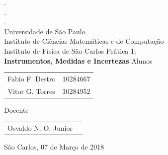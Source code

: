 \documentclass{article}
\begin{document}
\begin{titlepage}
	\centering
	{\Large
	{\color{white}.\\.\\.} \\
	Universidade de São Paulo\\
	Instituto de Ciências Matemáticas e de Computação\\\vspace{1.8mm}
	Instituto de Física de São Carlos}
	\vfill
	Prática 1:\\
	{\Large\textbf{
		Instrumentos, Medidas e Incertezas}}
	\vfill
	Alunos
	\begin{tabular}{c c}
		Fabio F. Destro & 10284667\\
		Vitor G. Torres & 10284952
	\end{tabular}
	\vfill
	Docente
	\begin{tabular}{c c}
		Osvaldo N. O. Junior
	\end{tabular}
	\vfill
	São Carlos, 07 de Março de 2018\\
\end{titlepage}
\end{document}

